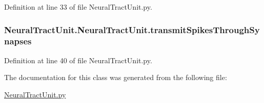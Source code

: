 Definition at line 33 of file Neural\+Tract\+Unit.\+py.

\subsubsection[{\texorpdfstring{transmit\+Spikes\+Through\+Synapses}{transmitSpikesThroughSynapses}}]{\setlength{\rightskip}{0pt plus 5cm}Neural\+Tract\+Unit.\+Neural\+Tract\+Unit.\+transmit\+Spikes\+Through\+Synapses}\hypertarget{class_neural_tract_unit_1_1_neural_tract_unit_ac6fa367f6ada8045919674feaed4f6ad}{}\label{class_neural_tract_unit_1_1_neural_tract_unit_ac6fa367f6ada8045919674feaed4f6ad}


Definition at line 40 of file Neural\+Tract\+Unit.\+py.



The documentation for this class was generated from the following file\+:\begin{DoxyCompactItemize}
\item 
\hyperlink{_neural_tract_unit_8py}{Neural\+Tract\+Unit.\+py}\end{DoxyCompactItemize}

